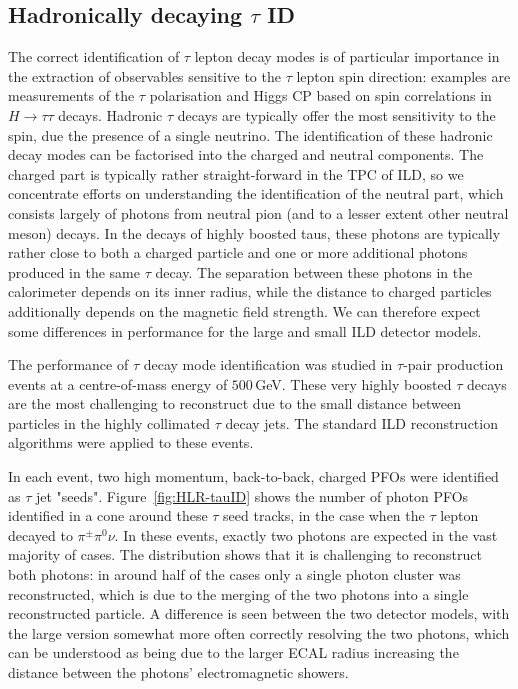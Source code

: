 \subsection{Hadronically decaying $\tau$ ID}
\label{sec:perf:hlr:tau}

The correct identification of $\tau$ lepton decay modes is of particular importance in the extraction of observables sensitive to the $\tau$ lepton spin direction: examples are measurements of the $\tau$ polarisation and Higgs CP based on spin correlations in $H \to \tau \tau$ decays.
Hadronic $\tau$ decays are typically offer the most sensitivity to the spin, due the presence of a single neutrino. 
The identification of these hadronic decay modes can be factorised into the charged and neutral components. 
The charged part is typically rather straight-forward in the TPC of ILD, so we concentrate efforts on understanding the identification of the neutral part, which consists largely of photons from neutral pion (and to a lesser extent other neutral meson) decays. 
In the decays of highly boosted taus, these photons are typically rather close to both a charged particle and one or more additional photons produced in the same $\tau$ decay. 
The separation between these photons in the calorimeter depends on its inner radius, while the distance to charged particles additionally depends on the magnetic field strength. 
We can therefore expect some differences in performance for the large and small ILD detector models.

The performance of $\tau$ decay mode identification was studied in $\tau$-pair production events at a centre-of-mass energy of $500$\,GeV. 
These very highly boosted $\tau$ decays are the most challenging to reconstruct due to the small distance between particles in the highly collimated $\tau$ decay jets.
The standard ILD reconstruction algorithms were applied to these events.

In each event, two high momentum, back-to-back, charged PFOs were identified as $\tau$ jet "seeds". Figure~\ref{fig:HLR-tauID} shows the number of photon PFOs identified in a cone around these $\tau$ seed tracks, in the case when the $\tau$ lepton decayed to $\pi^\pm \pi^0 \nu$.
In these events, exactly two photons are expected in the vast majority of cases. 
The distribution shows that it is challenging to reconstruct both photons: in around half of the cases only a single photon cluster was reconstructed, which is due to the merging of the two photons into a single reconstructed particle. 
A difference is seen between the two detector models, with the large version somewhat more often correctly resolving the two photons, which can be understood as being due to the larger ECAL radius increasing the distance between the photons' electromagnetic showers.


